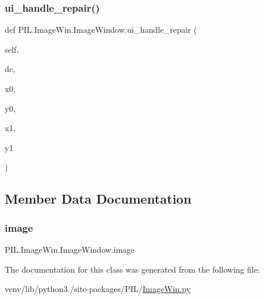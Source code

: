 \subsubsection{\texorpdfstring{ui\+\_\+handle\+\_\+repair()}{ui\_handle\_repair()}}
{\footnotesize\ttfamily def P\+I\+L.\+Image\+Win.\+Image\+Window.\+ui\+\_\+handle\+\_\+repair (\begin{DoxyParamCaption}\item[{}]{self,  }\item[{}]{dc,  }\item[{}]{x0,  }\item[{}]{y0,  }\item[{}]{x1,  }\item[{}]{y1 }\end{DoxyParamCaption})}



\subsection{Member Data Documentation}
\mbox{\label{classPIL_1_1ImageWin_1_1ImageWindow_a9edb1e11d923171cac68de8c3ab8daca}} 
\subsubsection{\texorpdfstring{image}{image}}
{\footnotesize\ttfamily P\+I\+L.\+Image\+Win.\+Image\+Window.\+image}



The documentation for this class was generated from the following file\+:\begin{DoxyCompactItemize}
\item 
venv/lib/python3./site-\/packages/\+P\+I\+L/\hyperlink{ImageWin_8py}{Image\+Win.\+py}\end{DoxyCompactItemize}
